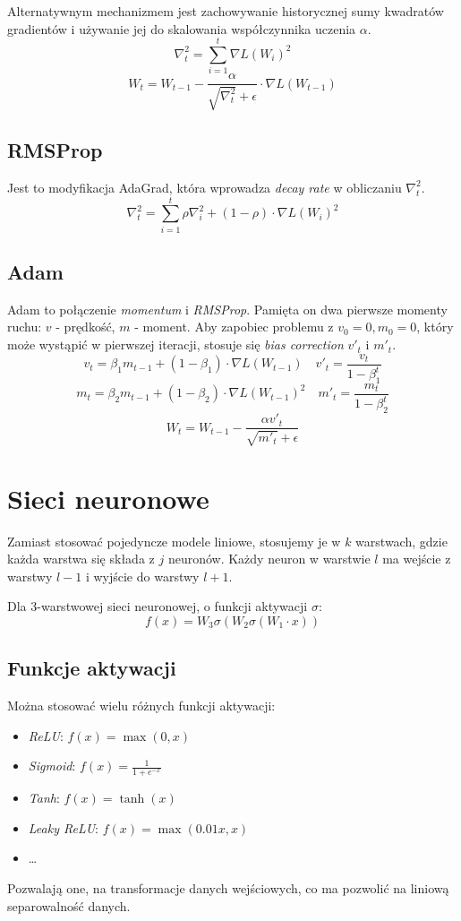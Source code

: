 \documentclass{../notatki}
\begin{document}
Alternatywnym mechanizmem jest zachowywanie historycznej sumy
kwadratów gradientów i używanie jej do skalowania współczynnika
uczenia $\alpha$.
$$
\nabla^2_t = \sum_{i=1}^{t} \nabla L(W_i)^2
$$
$$
W_t = W_{t - 1} - \frac{\alpha}{\sqrt{\nabla^2_t} + \epsilon} \cdot
\nabla L(W_{t-1})
$$

\subsection{RMSProp}

Jest to modyfikacja AdaGrad, która wprowadza \textit{decay rate} w
obliczaniu $\nabla^2_t$.
$$
\nabla^2_t = \sum_{i=1}^{t} \rho \nabla^2_{i} + (1 - \rho)
\cdot \nabla L(W_i)^2
$$

\subsection{Adam}

Adam to połączenie \textit{momentum} i \textit{RMSProp}. Pamięta on dwa pierwsze
momenty ruchu: $v$ - prędkość, $m$ - moment. Aby zapobiec problemu z
$v_0 = 0, m_0 = 0$, który może wystąpić w pierwszej iteracji, stosuje
się \textit{bias correction} $v'_t$ i $m'_t$.
$$
v_t = \beta_1 m_{t-1} + (1 - \beta_1) \cdot \nabla L(W_{t-1}) \quad
v'_t = \frac{v_t}{1 - \beta_1^t}
$$
$$
m_t = \beta_2 m_{t-1} + (1 - \beta_2) \cdot \nabla L(W_{t-1})^2 \quad
m'_t = \frac{m_t}{1 - \beta_2^t}
$$
$$
W_t = W_{t-1} - \frac{\alpha v'_t}{\sqrt{m'_t} + \epsilon}
$$

\section{Sieci neuronowe}

Zamiast stosować pojedyncze modele liniowe, stosujemy je w $k$ warstwach,
gdzie każda warstwa się składa z $j$ neuronów. Każdy neuron w warstwie
$l$ ma wejście z warstwy $l-1$ i wyjście do warstwy $l+1$.

Dla $3$-warstwowej sieci neuronowej, o funkcji aktywacji $\sigma$:
$$
f(x) = W_3 \sigma(W_2 \sigma(W_1 \cdot x))
$$

\subsection{Funkcje aktywacji}

Można stosować wielu różnych funkcji aktywacji:
\begin{itemize}
  \item \textit{ReLU}: $f(x) = \max(0, x)$
  \item \textit{Sigmoid}: $f(x) = \frac{1}{1 + e^{-x}}$
  \item \textit{Tanh}: $f(x) = \tanh(x)$
  \item \textit{Leaky ReLU}: $f(x) = \max(0.01x, x)$
  \item \dots
\end{itemize}
Pozwalają one, na transformacje danych wejściowych, co ma pozwolić na liniową
separowalność danych.
\end{document}
